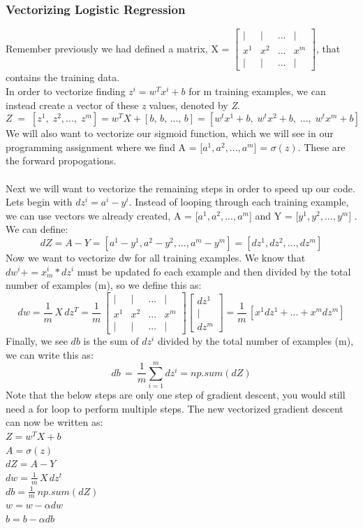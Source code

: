 \documentclass[11pt, a4paper]{article}
\begin{document}
\begin{spacing}{1.1}
	\subsubsection{Vectorizing Logistic Regression}
	Remember previously we had defined a matrix, X = $\begin{bmatrix} | & | & ... & | \\ x^1 & x^2 & ... & x^m \\ | & | & ... & | \end{bmatrix}$, that contains the training data. \vspace*{1mm}\\ In order to vectorize finding $ z^i = w^Tx^i + b$ for m training examples, we can instead create a vector of these \textit{z} values, denoted by \textit{Z}.  $$ Z\; =\; [z^1,\; z^2,...,\; z^m] = w^TX + [b,\, b,\,...,\,b] = [w^tx^1+b,\; w^tx^2+b,\;...,\; w^tx^m+b]$$ 
	We will also want to vectorize our sigmoid function, which we will see in our programming assignment where we find A = [$a^1, a^2,..., a^m$] = $\sigma(z)$. These are the forward propogations. \\~\\
	Next we will want to vectorize the remaining steps in order to speed up our code. Lets begin with $dz^i = a^i - y^i$. Instead of looping through each training example, we can use vectors we already created, A = [$a^1, a^2,..., a^m$]  and Y = [$y^1, y^2,..., y^m$] . We can define: $$ dZ = A - Y = [a^1-y^1, a^2-y^2,..., a^m-y^m] = [dz^1, dz^2, ..., dz^m] $$ Now we want to vectorize dw for all training examples. We know that $dw^i += x^i_m*dz^i$ must be updated fo each example and then divided by the total number of examples (m), so we define this as: $$ dw = \frac{1}{m}\,X\, dz^T = \frac{1}{m}\, \begin{bmatrix} | & | & ... & | \\ x^1 & x^2 & ... & x^m \\ | & | & ... & | \end{bmatrix} \begin{bmatrix} dz^1\\ | \\ dz^m \end{bmatrix}  = \frac{1}{m}\, [x^1dz^1 + ... + x^m dz^m]$$ Finally, we see $db$ is the sum of $dz^i$ divided by the total number of examples (m), we can write this as: $$ db \, = \, \frac{1}{m} \sum_{i=1}^m dz^i = np.sum(dZ)$$
	Note that the below steps are only one step of gradient descent, you would still need a for loop to perform multiple steps. The new vectorized gradient descent can now be written as: \vspace*{2mm} \\
	$ Z = w^TX+b$ \\
	$ A = \sigma(z)$ \\
	$ dZ = A-Y$ \\
	$ dw = \frac{1}{m}\,X\,dz^t$ \\
	$ db = \frac{1}{m}\ np.sum(dZ)$ \\
	$w = w - \alpha dw$\\
	$b = b - \alpha db$ \newpage


\end{spacing}
\end{document}
